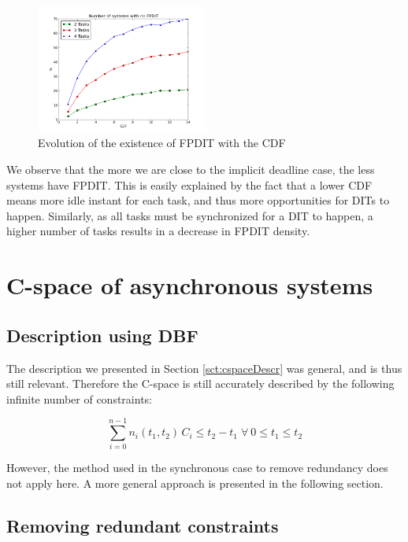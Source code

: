 \documentclass[conference]{IEEEtran}
\begin{document}
	\begin{figure}[h]
	\begin{center}
		\includegraphics[width=0.5\textwidth]{python-simulation/plots/nofpdit.png}
	\end{center}
	\caption{Evolution of the existence of FPDIT with the CDF}
	\label{fig:noFPDIT}
	\end{figure}

	We observe that the more we are close to the implicit deadline case, the less systems have FPDIT. This is easily explained by the fact that a lower CDF means more idle instant for each task, and thus more opportunities for DITs to happen. Similarly, as all tasks must be synchronized for a DIT to happen, a higher number of tasks results in a decrease in FPDIT density.

\section{C-space of asynchronous systems}
\label{sct:asyncCspace}

	\subsection{Description using DBF}

		The description we presented in Section \ref{sct:cspaceDescr} was general, and
		is thus still relevant. Therefore the C-space is still accurately described by
		the following infinite number of constraints:

		\[
			\sum_{i=0}^{n-1} n_i(t_1, t_2)
			\, C_i \leq t_2 - t_1 \; \forall \: 0 \leq t_1 \leq t_2
		\]

		However, the method used in the synchronous case to remove redundancy does not
		apply here. A more general approach is presented in the following section.

	\subsection{Removing redundant constraints}
\end{document}
